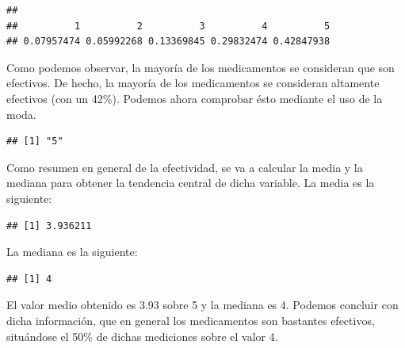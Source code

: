 \documentclass[spanish,]{article}
\newenvironment{Shaded}{\begin{snugshade}}{\end{snugshade}}
\newcommand{\KeywordTok}[1]{\textcolor[rgb]{0.13,0.29,0.53}{\textbf{#1}}}
\newcommand{\CommentTok}[1]{\textcolor[rgb]{0.56,0.35,0.01}{\textit{#1}}}
\newcommand{\OperatorTok}[1]{\textcolor[rgb]{0.81,0.36,0.00}{\textbf{#1}}}
\newcommand{\NormalTok}[1]{#1}
\begin{document}
\begin{verbatim}
## 
##          1          2          3          4          5 
## 0.07957474 0.05992268 0.13369845 0.29832474 0.42847938
\end{verbatim}

Como podemos observar, la mayoría de los medicamentos se consideran que
son efectivos. De hecho, la mayoría de los medicamentos se consideran
altamente efectivos (con un 42\%). Podemos ahora comprobar ésto mediante
el uso de la moda.

\begin{Shaded}
\end{Shaded}

\begin{verbatim}
## [1] "5"
\end{verbatim}

Como resumen en general de la efectividad, se va a calcular la media y
la mediana para obtener la tendencia central de dicha variable. La media
es la siguiente:

\begin{Shaded}
\end{Shaded}

\begin{verbatim}
## [1] 3.936211
\end{verbatim}

La mediana es la siguiente:

\begin{Shaded}
\end{Shaded}

\begin{verbatim}
## [1] 4
\end{verbatim}

El valor medio obtenido es 3.93 sobre 5 y la mediana es 4. Podemos
concluir con dicha información, que en general los medicamentos son
bastantes efectivos, situándose el 50\% de dichas mediciones sobre el
valor 4.
\end{document}
